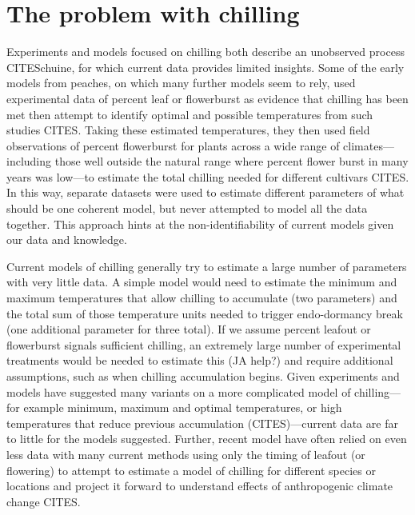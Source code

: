 \documentclass[11pt]{article}
\begin{document}
\section*{The problem with chilling} 

Experiments and models focused on chilling both describe an unobserved process CITESchuine, for which current data provides limited insights. Some of the early models from peaches, on which many further models seem to rely, used experimental data of percent leaf or flowerburst as evidence that chilling has been met then attempt to identify optimal and possible temperatures from such studies CITES. Taking these estimated temperatures, they then used field observations of percent flowerburst for plants across a wide range of climates---including those well outside the natural range where percent flower burst in many years was low---to estimate the total chilling needed for different cultivars CITES. In this way, separate datasets were used to estimate different parameters of what should be one coherent model, but never attempted to model all the data together. This approach hints at the non-identifiability of current models given our data and knowledge. 


Current models of chilling generally try to estimate a large number of parameters with very little data. A simple model would need to estimate the minimum and maximum temperatures that allow chilling to accumulate (two parameters) and the total sum of those temperature units needed to trigger endo-dormancy break (one additional parameter for three total). If we assume percent leafout or flowerburst signals sufficient chilling, an extremely large number of experimental treatments would be needed to estimate this (JA help?) and require additional assumptions, such as when chilling accumulation begins. Given experiments and models have suggested many variants on a more complicated model of chilling---for example minimum, maximum and optimal temperatures, or high temperatures that reduce previous accumulation (CITES)---current data are far to little for the models suggested. Further, recent model have often relied on even less data with many current methods using only the timing of leafout (or flowering) to attempt to estimate a model of chilling for different species or locations and project it forward to understand effects of anthropogenic climate change CITES. %
\end{document}
